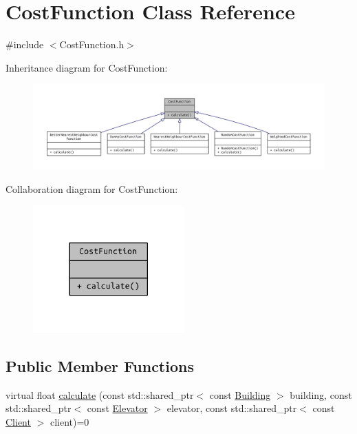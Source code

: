 \hypertarget{class_cost_function}{}\section{Cost\+Function Class Reference}
\label{class_cost_function}


{\ttfamily \#include $<$Cost\+Function.\+h$>$}



Inheritance diagram for Cost\+Function\+:
\nopagebreak
\begin{figure}[H]
\begin{center}
\leavevmode
\includegraphics[width=350pt]{class_cost_function__inherit__graph}
\end{center}
\end{figure}


Collaboration diagram for Cost\+Function\+:
\nopagebreak
\begin{figure}[H]
\begin{center}
\leavevmode
\includegraphics[width=165pt]{class_cost_function__coll__graph}
\end{center}
\end{figure}
\subsection*{Public Member Functions}
\begin{DoxyCompactItemize}
\item 
virtual float \hyperlink{class_cost_function_ada1a1003e80f4f0e57b20d9a1e6a51c6}{calculate} (const std\+::shared\+\_\+ptr$<$ const \hyperlink{class_building}{Building} $>$ building, const std\+::shared\+\_\+ptr$<$ const \hyperlink{class_elevator}{Elevator} $>$ elevator, const std\+::shared\+\_\+ptr$<$ const \hyperlink{class_client}{Client} $>$ client)=0
\end{DoxyCompactItemize}


